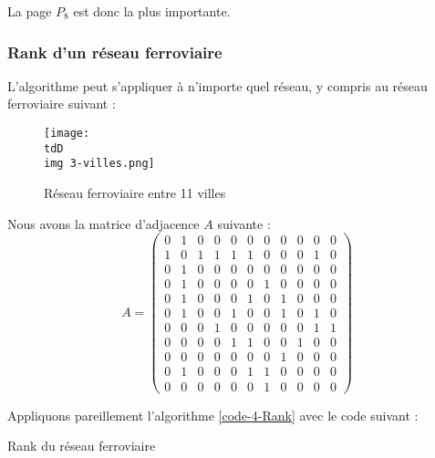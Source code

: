 			La page $P_8$ est donc la plus importante.

		\subsubsection{Rank d'un réseau ferroviaire}


			L'algorithme peut s'appliquer à n'importe quel réseau, y compris au réseau ferroviaire suivant :

			\begin{figure}[H]
				\centering
				\texttt{[image: \\tdD\\img 3-villes.png]}
				\caption{Réseau ferroviaire entre 11 villes}
				\label{img-4-villes}
			\end{figure}

			Nous avons la matrice d'adjacence $A$ suivante :
			$$
				A = \begin{pmatrix}
					0 & 1 & 0 & 0 & 0 & 0 & 0 & 0 & 0 & 0 & 0 \\
					1 & 0 & 1 & 1 & 1 & 1 & 0 & 0 & 0 & 1 & 0 \\
					0 & 1 & 0 & 0 & 0 & 0 & 0 & 0 & 0 & 0 & 0 \\
					0 & 1 & 0 & 0 & 0 & 0 & 1 & 0 & 0 & 0 & 0 \\
					0 & 1 & 0 & 0 & 0 & 1 & 0 & 1 & 0 & 0 & 0 \\
					0 & 1 & 0 & 0 & 1 & 0 & 0 & 1 & 0 & 1 & 0 \\
					0 & 0 & 0 & 1 & 0 & 0 & 0 & 0 & 0 & 1 & 1 \\
					0 & 0 & 0 & 0 & 1 & 1 & 0 & 0 & 1 & 0 & 0 \\
					0 & 0 & 0 & 0 & 0 & 0 & 0 & 1 & 0 & 0 & 0 \\
					0 & 1 & 0 & 0 & 0 & 1 & 1 & 0 & 0 & 0 & 0 \\
					0 & 0 & 0 & 0 & 0 & 0 & 1 & 0 & 0 & 0 & 0
				\end{pmatrix}
			$$
			
			Appliquons pareillement l'algorithme \ref{code-4-Rank} avec le code suivant :

			\begin{listing}[H]
				\caption{Rank du réseau ferroviaire}
				\label{code-4-rankVilles}
			\end{listing}

